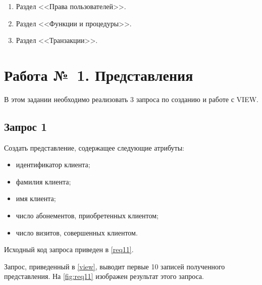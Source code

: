 \documentclass[11pt, a4paper]{article}
\begin{document}
\begin{enumerate}
\begin{enumerate}
\begin{itemize}
				\item для таблицы <<Визит>> создать триггеры на операции вставки и удаления.
			\end{itemize}
			
			Привести обновленную схему базы данных, содержащую полную информацию о работе триггеров.
			
			
			\item Часть 3.
			
			Для каждого из созданных триггеров написать тесты, проверяющие корректность обновления данных.
		\end{enumerate}
		
		\item Раздел <<Права пользователей>>.
		
		
		\item Раздел <<Функции и процедуры>>.
		
		
		\item Раздел <<Транзакции>>.
	\end{enumerate}
	
	
	\newpage
	\section{Работа №~1. Представления}
	\hfill
	
	В этом задании необходимо реализовать 3 запроса по созданию и работе с VIEW.
	
	\subsection{Запрос 1}
		\hfill
		
		Создать представление, содержащее следующие атрибуты:
		\begin{itemize}
			\item идентификатор клиента;
			\item фамилия клиента;
			\item имя клиента;
			\item число абонементов, приобретенных клиентом;
			\item число визитов, совершенных клиентом.
		\end{itemize}
		
		Исходный код запроса приведен в \cref{req11}.
	
		
		
		Запрос, приведенный в \cref{view}, выводит первые 10 записей полученного представления. На \cref{fig:req11} изображен результат этого запроса.
		
\end{document}
